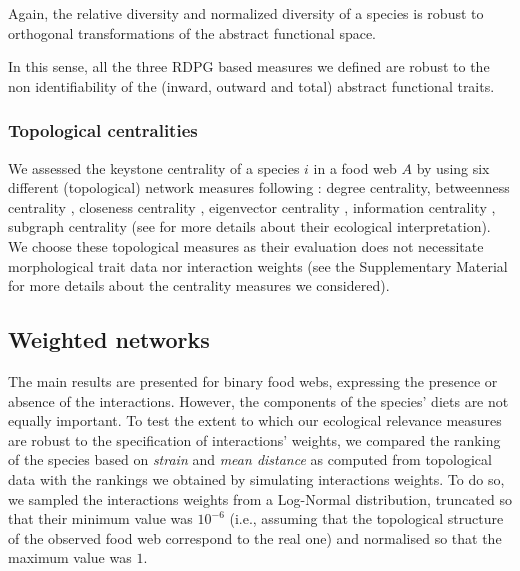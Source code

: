 \documentclass[]{rsos}%
\begin{document}
Again, the relative diversity and normalized diversity of a species is robust to
orthogonal transformations of the abstract functional space.

In this sense, all the three RDPG based measures we defined are robust to the non identifiability
of the (inward, outward and total) abstract functional traits.


\subsubsection{Topological centralities}

We assessed the keystone centrality of a species $i$ in a food web $A$ by using
six different (topological) network measures following
\citet{estrada2007characterization}: degree centrality, betweenness centrality \citep{brandes2001faster},
closeness centrality  \citep{freeman1979centrality}, eigenvector centrality
\citep{bonacich2001eigenvector}, information centrality
\citep{stephenson1989rethinking}, subgraph centrality
\citep{estrada2005subgraph} (see \citep{jordan2009trophic} for
more details about their ecological interpretation). We choose these topological
measures as their evaluation does not necessitate morphological trait data nor
interaction weights (see the Supplementary Material for more details about the centrality
measures we considered).

\subsection{Weighted networks}

The main results are presented for binary food webs, expressing the presence or absence
of the interactions. However, the components of the species'
diets are not equally important. To test the extent to which our ecological relevance measures are robust to the specification
of interactions' weights, we compared the ranking of the species based on \emph{strain} and \emph{mean distance} as
computed from topological data with the rankings we obtained by simulating interactions weights.
To do so, we sampled the interactions weights from a Log-Normal distribution,
truncated so that their minimum value was $10^{-6}$ (i.e., assuming that the topological structure
of the observed food web correspond to the real one) and normalised so that the maximum value
was $1$.
\end{document}
